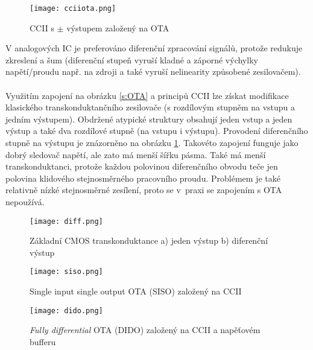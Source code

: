 \begin{figure}[h]
\centering
\texttt{[image: cciiota.png]}
\caption[CCII s $\pm$ výstupem založený na OTA]{CCII s $\pm$ výstupem založený na OTA \cite{15}}
\end{figure}
\newline
V analogových IC je preferováno diferenční zpracování signálů, protože redukuje zkreslení a šum (diferenční stupeň vyruší kladné a záporné výchylky napětí/proudu např. na zdroji a také vyruší nelinearity způsobené zesilovačem).\\
\\
Využitím zapojení na obrázku \ref{s:OTA} a principů CCII lze získat modifikace klasického transkonduktančního zesilovače (s rozdílovým stupněm na vstupu a jedním výstupem). Obdržené atypické struktury obsahují jeden vstup a jeden výstup a také dva rozdílové stupně (na vstupu i výstupu). Provodení diferenčního stupně na výstupu je znázorněno na obrázku \ref{s:CMOS}. Takovéto zapojení funguje jako dobrý sledovač napětí, ale zato má menší šířku pásma. Také má menší transkonduktanci, protože každou polovinou diferenčního obvodu teče jen polovina klidového stejnosměrného pracovního proudu. Problémem je také relativně nízké stejnosměrné zesílení, proto se v~praxi se zapojením s OTA nepoužívá. \\
\begin{figure}[h]
\centering
\texttt{[image: diff.png]}
\caption[Základní CMOS transkonduktance a) jeden výstup b) diferenční výstup]{Základní CMOS transkonduktance a) jeden výstup b) diferenční výstup \cite{19} \label{s:CMOS}}
\end{figure}
\begin{figure}[h]
\centering
\texttt{[image: siso.png]}
\caption[Single input single output OTA (SISO) založený na CCII]{Single input single output OTA (SISO) založený na CCII \cite{15}}
\end{figure}
\begin{figure}[h]
\centering
\texttt{[image: dido.png]}
\caption[\textit{Fully differential} OTA (DIDO) založený na CCII a napěťovém bufferu]{\textit{Fully differential} OTA (DIDO) založený na CCII a napěťovém bufferu \cite{15}}
\end{figure}
\newpage
